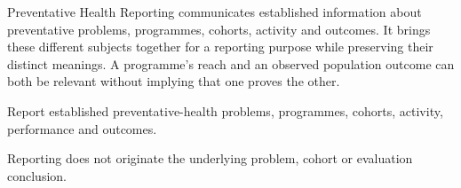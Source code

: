Preventative Health Reporting communicates established information about preventative problems, programmes, cohorts, activity and outcomes. It brings these different subjects together for a reporting purpose while preserving their distinct meanings. A programme's reach and an observed population outcome can both be relevant without implying that one proves the other.



Report established preventative-health problems, programmes, cohorts, activity, performance and outcomes.



Reporting does not originate the underlying problem, cohort or evaluation conclusion.


